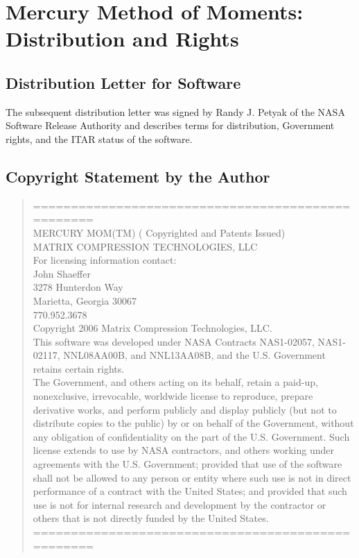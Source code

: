 % 

\section{Mercury Method of Moments: Distribution and Rights}

\subsection{Distribution Letter for Software}
The subsequent distribution letter was signed by Randy J. Petyak of the NASA Software Release Authority and describes terms for distribution, Government rights, and the ITAR status of the software.


\subsection{Copyright Statement by the Author}
\begin{quotation}
{\footnotesize{
\noindent
==================================================\\
    MERCURY MOM(TM) ( Copyrighted and Patents Issued) \\
	MATRIX COMPRESSION TECHNOLOGIES, LLC \\[10pt]
	For licensing information contact: \\
	John Shaeffer\\
	3278 Hunterdon Way\\
	Marietta, Georgia 30067\\
	770.952.3678 \\	
	Copyright 2006 Matrix Compression Technologies, LLC.\\	[10pt]
	This software was developed under NASA Contracts NAS1-02057, NAS1-02117, 
	NNL08AA00B, and NNL13AA08B, and the U.S. Government retains certain rights.\\[10pt]
	The Government, and others acting on its behalf, retain a paid-up, 
	nonexclusive, irrevocable, worldwide license to reproduce, prepare 
	derivative works, and perform publicly and display publicly (but not to 
	distribute copies to the public) by or on behalf of the Government, without
	any obligation of confidentiality on the part of the U.S. Government. Such
	license extends to use by NASA contractors, and others working under 
	agreements with the U.S. Government; provided that use of the software shall
	not be allowed to any person or entity where such use is not in direct 
	performance of a contract with the United States; and provided that such use
	is not for internal research and development by the contractor or others 
	that is not directly funded by the United States.
==================================================
}}
\end{quotation}

